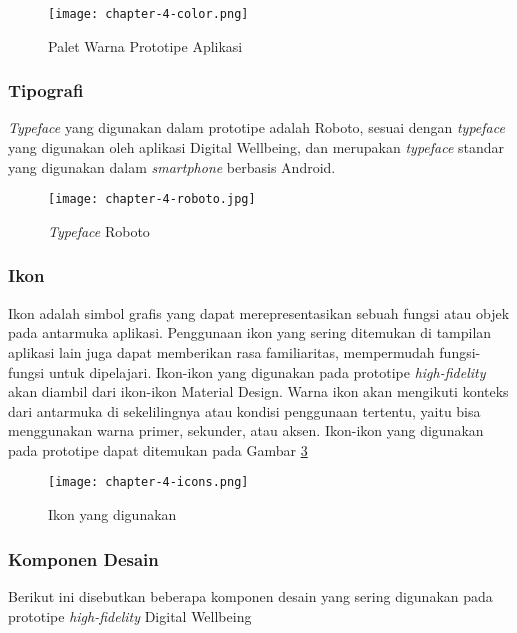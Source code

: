 \begin{figure}[h]
  \centering
  \texttt{[image: chapter-4-color.png]}
  \caption{Palet Warna Prototipe Aplikasi}
  \label{img:pallete}
\end{figure}
\FloatBarrier

\subsubsection{Tipografi}
\label{subsubsec:aspek_tipografi}
\textit{Typeface} yang digunakan dalam prototipe adalah Roboto, sesuai dengan \textit{typeface} yang digunakan oleh aplikasi Digital Wellbeing, dan merupakan \textit{typeface} standar yang digunakan dalam \textit{smartphone} berbasis Android.

\begin{figure}[h]
  \centering
  \texttt{[image: chapter-4-roboto.jpg]}
  \caption{\textit{Typeface} Roboto}
  \label{img:typeface}
\end{figure}
\FloatBarrier

\subsubsection{Ikon}
\label{subsubsec:aspek_ikon}
Ikon adalah simbol grafis yang dapat merepresentasikan sebuah fungsi atau objek pada antarmuka aplikasi. Penggunaan ikon yang sering ditemukan di tampilan aplikasi lain juga dapat memberikan rasa familiaritas, mempermudah fungsi-fungsi untuk dipelajari. Ikon-ikon yang digunakan pada prototipe \textit{high-fidelity} akan diambil dari ikon-ikon Material Design. Warna ikon akan mengikuti konteks dari antarmuka di sekelilingnya atau kondisi penggunaan tertentu, yaitu bisa menggunakan warna primer, sekunder, atau aksen. Ikon-ikon yang digunakan pada prototipe dapat ditemukan pada Gambar \ref{img:icons}

\begin{figure}[h]
  \centering
  \texttt{[image: chapter-4-icons.png]}
  \caption{Ikon yang digunakan}
  \label{img:icons}
\end{figure}
\FloatBarrier
 
\subsubsection{Komponen Desain}
\label{subsubsec:aspek_komponen}

Berikut ini disebutkan beberapa komponen desain yang sering digunakan pada prototipe \textit{high-fidelity} Digital Wellbeing

